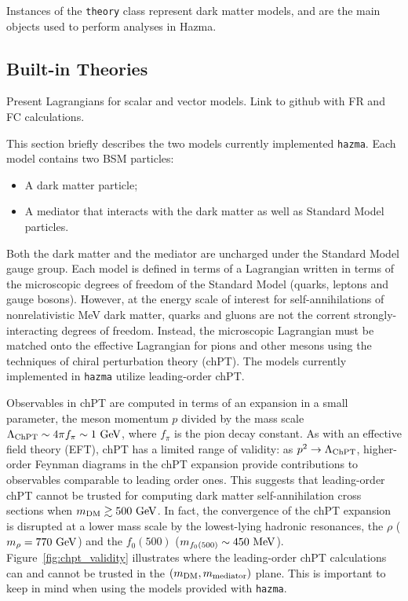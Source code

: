 Instances of the \texttt{theory} class represent dark matter models, and are the main objects used to perform analyses in Hazma. 

\subsection{Built-in Theories}%
\label{sub:built_in_theories}

Present Lagrangians for scalar and vector models. Link to github with FR and FC calculations.

This section briefly describes the two models currently implemented \texttt{hazma}. Each model contains two BSM particles:
\begin{itemize}
    \item A dark matter particle;
    \item A mediator that interacts with the dark matter as well as Standard Model particles.
\end{itemize}
Both the dark matter and the mediator are uncharged under the Standard Model gauge group. Each model is defined in terms of a Lagrangian written in terms of the microscopic degrees of freedom of the Standard Model (quarks, leptons and gauge bosons). However, at the energy scale of interest for self-annihilations of nonrelativistic MeV dark matter, quarks and gluons are not the corrent strongly-interacting degrees of freedom. Instead, the microscopic Lagrangian must be matched onto the effective Lagrangian for pions and other mesons using the techniques of chiral perturbation theory (chPT). The models currently implemented in \texttt{hazma} utilize leading-order chPT. 

Observables in chPT are computed in terms of an expansion in a small parameter, the meson momentum $p$ divided by the mass scale $\Lambda_{\mathrm{ChPT}} \sim 4 \pi f_\pi \sim 1{~\mathrm{GeV}}$, where $f_\pi$ is the pion decay constant. As with an effective field theory (EFT), chPT has a limited range of validity: as $p^2 \to \Lambda_{\mathrm{ChPT}}$, higher-order Feynman diagrams in the chPT expansion provide contributions to observables comparable to leading order ones. This suggests that leading-order chPT cannot be trusted for computing dark matter self-annihilation cross sections when $m_{\mathrm{DM}} \gtrsim 500{~\mathrm{GeV}}$. In fact, the convergence of the chPT expansion is disrupted at a lower mass scale by the lowest-lying hadronic resonances, the $\rho$ ($m_\rho = 770{~\mathrm{GeV}}$) and the $f_0(500)$ ($m_{f_0(500)} \sim 450{~\mathrm{MeV}}$). Figure~\ref{fig:chpt_validity} illustrates where the leading-order chPT calculations can and cannot be trusted in the $(m_{\mathrm{DM}}, m_{\mathrm{mediator}})$ plane. This is important to keep in mind when using the models provided with \texttt{hazma}.

